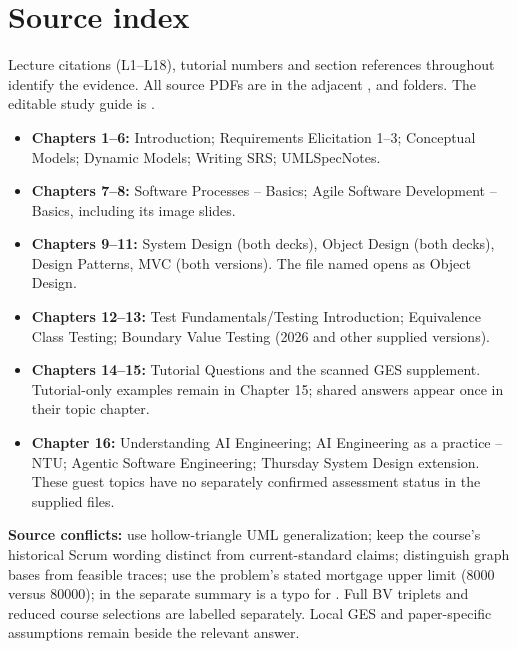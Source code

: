 \section*{Source index}\label{source-notes}

\begin{studycolumns}
\vspace{0pt}
Lecture citations (L1--L18), tutorial numbers and section references throughout identify the evidence. All source PDFs are in the adjacent ,  and  folders. The editable study guide is .
\begin{itemize}
\item \textbf{Chapters 1--6:} Introduction; Requirements Elicitation 1--3; Conceptual Models; Dynamic Models; Writing SRS; UMLSpecNotes.
\item \textbf{Chapters 7--8:} Software Processes -- Basics; Agile Software Development -- Basics, including its image slides.
\item \textbf{Chapters 9--11:} System Design (both decks), Object Design (both decks), Design Patterns, MVC (both versions). The file named  opens as Object Design.
\item \textbf{Chapters 12--13:} Test Fundamentals/Testing Introduction; Equivalence Class Testing; Boundary Value Testing (2026 and other supplied versions).
\item \textbf{Chapters 14--15:} Tutorial Questions and the scanned GES supplement. Tutorial-only examples remain in Chapter 15; shared answers appear once in their topic chapter.
\item \textbf{Chapter 16:} Understanding AI Engineering; AI Engineering as a practice -- NTU; Agentic Software Engineering; Thursday System Design extension. These guest topics have no separately confirmed assessment status in the supplied files.
\end{itemize}
\textbf{Source conflicts:} use hollow-triangle UML generalization; keep the course's historical Scrum wording distinct from current-standard claims; distinguish graph bases from feasible traces; use the problem's stated mortgage upper limit (8000 versus 80000);  in the separate summary is a typo for . Full BV triplets and reduced course selections are labelled separately. Local GES and paper-specific assumptions remain beside the relevant answer.
\end{studycolumns}
